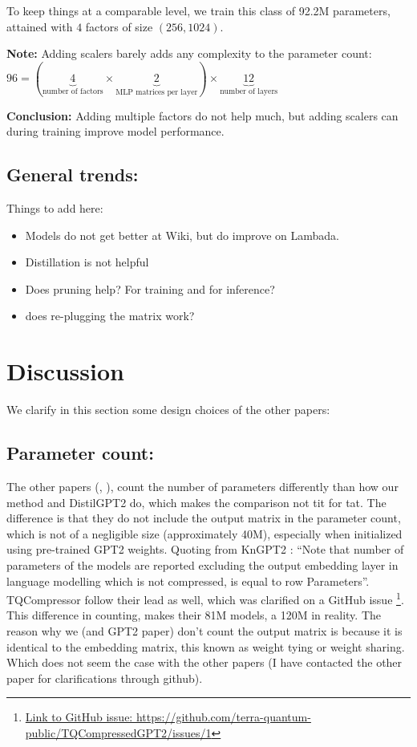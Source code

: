 \documentclass{article}
\begin{document}
{To keep things at a comparable level, we train this class of 92.2M parameters, attained with $4$ factors of size $(256, 1024)$. 


\textbf{Note:} Adding scalers barely adds any complexity to the parameter count: $96 = (\underbrace{4}_{\text{number of factors}} \times \underbrace{2}_{\text{MLP matrices per layer}}) \times \underbrace{12}_{\text{number of layers}}$ 


\textbf{Conclusion:} Adding multiple factors do not help much, but adding scalers can during training improve model performance.

\subsection{General trends:}%

Things to add here:

\begin{itemize}
	\item Models do not get better at Wiki, but do improve on Lambada.
	\item Distillation is not helpful 
	\item Does pruning help? For training and for inference?
	\item does re-plugging the matrix work? 
\end{itemize}

\section{Discussion}%
\label{sec:Discussion}

We clarify in this section some design choices of the other papers:

\subsection{Parameter count:}%
\label{sub:Parameter count:}

The other papers (\cite{tahaei2022kroneckerbert}, \cite{abronin2024tqcompressor}), count the number of parameters differently than how our method and DistilGPT2 do, which makes the comparison not tit for tat. The difference is that they do not include the output matrix in the parameter count, which is not of a negligible size (approximately 40M), especially when initialized using pre-trained GPT2 weights. Quoting from KnGPT2 \cite{tahaei2022kroneckerbert}: ``Note that number of parameters of the models are reported excluding the output embedding layer in language modelling which is not compressed, is equal to row Parameters''. TQCompressor \cite{abronin2024tqcompressor} follow their lead as well, which was clarified on a GitHub issue \footnote{\href{https://github.com/terra-quantum-public/TQCompressedGPT2/issues/1}{Link to GitHub issue: https://github.com/terra-quantum-public/TQCompressedGPT2/issues/1}}.
This difference in counting, makes their 81M models, a 120M in reality. The reason why we (and GPT2 paper) don't count the output matrix is because it is identical to the embedding matrix, this known as weight tying or weight sharing. Which does not seem the case with the other papers (I have contacted the other paper for clarifications through github).

}
\end{document}
